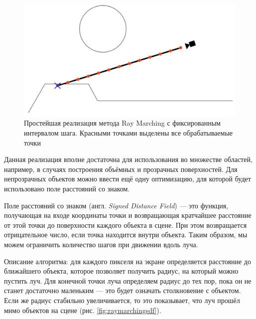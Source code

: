 \begin{figure}[h]
	\centering
	\captionsetup{justification=centering}
	\includegraphics[width=120mm]{img/raymarchingfixed.png}
	\caption{Простейшая реализация метода Ray Marching с фиксированным интервалом шага. Красными точками выделены все обрабатываемые точки}
	\label{fig:raymarchingfixed}
\end{figure}

Данная реализация вполне достаточна для использования во множестве 
областей, например, в случаях построения объёмных и прозрачных 
поверхностей.
Для непрозрачных объектов можно ввести ещё одну 
оптимизацию, для которой будет использовано поле расстояний со знаком.

Поле расстояний со знаком (англ. \textit{Signed Distance Field}) — это функция, 
получающая на входе координаты точки и возвращающая кратчайшее 
расстояние от этой точки до поверхности каждого объекта в сцене.
При этом возвращается отрицательное число, если точка находится внутри объекта.
Таким образом, мы можем ограничить количество шагов при движении вдоль 
луча.

Описание алгоритма: для каждого пикселя на экране определяется 
расстояние до ближайшего объекта, которое позволяет получить радиус, на который 
можно пустить луч. 
Для конечной точки луча определяем радиус до тех пор, 
пока он не станет достаточно маленьким --- это будет означать столкновение с 
объектом.
Если же радиус стабильно увеличивается, то это показывает, что луч 
прошёл мимо объектов на сцене (рис. \ref{fig:raymarchingsdf}).
\clearpage

